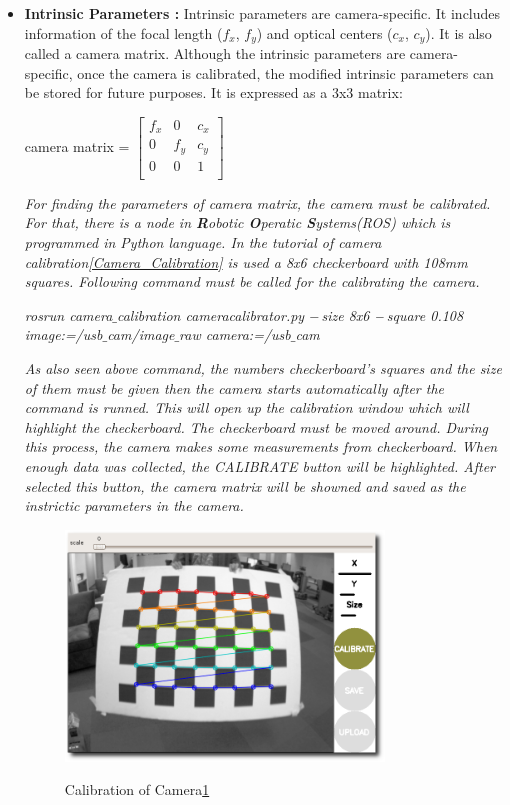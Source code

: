 \begin{itemize}

\item \textbf{Intrinsic Parameters :} Intrinsic parameters are camera-specific. It includes
information of the focal length ($f_x$, $f_y$) and optical centers ($c_x$, $c_y$). It is also called a camera matrix. Although the intrinsic parameters are camera-specific, once the camera is calibrated, the modified intrinsic parameters can be stored for future purposes. It is expressed as a 3x3 matrix:

 \begin{center}
  camera matrix =  $
 \begin{bmatrix} 
f_x & 0 & c_x \\
0 & f_y & c_y \\
0 & 0 & 1 \\
\end{bmatrix}
$  \end{center}


\emph{\color{blue} For finding the parameters of camera matrix, the camera must be calibrated. For that, there is a node in \textbf{R}obotic \textbf{O}peratic \textbf{S}ystems(ROS) which is programmed in Python language. In the tutorial of camera calibration\ref{Camera_Calibration} is used a 8x6 checkerboard with 108mm squares. Following command must be called for the calibrating the camera.}  

\textit{ rosrun camera$ \_ $calibration cameracalibrator.py $ \-- $size 8x6 $ \-- $square 0.108 image:=/usb$ \_ $cam/image$ \_ $raw camera:=/usb$ \_ $cam}

\emph{\color{blue}As also seen above command, the numbers checkerboard's squares and the size of them must be given then the camera starts automatically after the command is runned. This will open up the calibration window which will highlight the checkerboard. The checkerboard must be moved around. During this process, the camera makes some measurements from checkerboard. When enough data was collected, the \textit{CALIBRATE} button will be highlighted. After selected this button, the camera matrix will be showned and saved as the instrictic parameters in the camera.}


\begin{figure}[H]
 \centering
  \includegraphics[width=0.8\textwidth]{./Bilder/Camera_Calibration_fig.png}\label{Calibration_of_Camera}
  \caption{Calibration of Camera\ref{Calibration_of_Camera}}
\end{figure}


\end{itemize}

